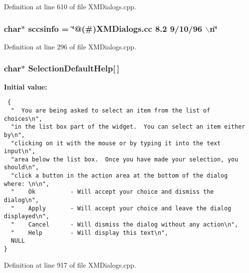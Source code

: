 Definition at line 610 of file XMDialogs.cpp.
\subsubsection{\setlength{\rightskip}{0pt plus 5cm}char$\ast$ sccsinfo = \char`\"{}@(\#)XMDialogs.cc 8.2 9/10/96 $\backslash$n\char`\"{}\hspace{0.3cm}{\tt  [static]}}\label{XMDialogs_8cpp_a1}




Definition at line 296 of file XMDialogs.cpp.
\subsubsection{\setlength{\rightskip}{0pt plus 5cm}char$\ast$ Selection\-Default\-Help[$\,$]\hspace{0.3cm}{\tt  [static]}}\label{XMDialogs_8cpp_a3}


{\bf Initial value:}

\footnotesize\begin{verbatim} {
  "  You are being asked to select an item from the list of choices\n",
  "in the list box part of the widget.  You can select an item either by\n",
  "clicking on it with the mouse or by typing it into the text input\n",
  "area below the list box.  Once you have made your selection, you should\n",
  "click a button in the action area at the bottom of the dialog where: \n\n",
  "    Ok          - Will accept your choice and dismiss the dialog\n",
  "    Apply       - Will accept your choice and leave the dialog displayed\n",
  "    Cancel      - Will dismiss the dialog without any action\n",
  "    Help        - Will display this text\n",
  NULL
}\end{verbatim}\normalsize 


Definition at line 917 of file XMDialogs.cpp.